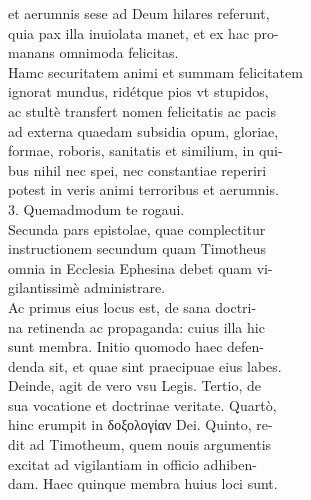 \documentclass{article}
\begin{document}
\begin{pages}
                et aerumnis sese ad Deum hilares referunt, \\
                quia pax illa inuiolata manet, et ex hac pro- \\
                manans omnimoda felicitas. \\
                Hamc securitatem animi et summam felicitatem \\
                ignorat mundus, ridétque pios vt stupidos, \\
                ac stultè transfert nomen felicitatis ac pacis \\
                ad externa quaedam subsidia opum, gloriae, \\
                formae, roboris, sanitatis et similium, in qui- \\
                bus nihil nec spei, nec constantiae reperiri \\
                potest in veris animi terroribus et aerumnis. \\
                3. Quemadmodum te rogaui. \\
                Secunda pars epistolae, quae complectitur \\
                instructionem secundum quam Timotheus \\
                omnia in Ecclesia Ephesina debet quam vi- \\
                gilantissimè administrare. \\
                Ac primus eius locus est, de sana doctri- \\
                na retinenda ac propaganda: cuius illa hic \\
                sunt membra. Initio quomodo haec defen- \\
                denda sit, et quae sint praecipuae eius labes. \\
                Deinde, agit de vero vsu Legis. Tertio, de \\
                sua vocatione et doctrinae veritate. Quartò, \\
                hinc erumpit in δοξολογίαν Dei. Quinto, re- \\
                dit ad Timotheum, quem nouis argumentis \\
                excitat ad vigilantiam in officio adhiben- \\
                dam. Haec quinque membra huius loci sunt. \\

\end{pages}
\end{document}
